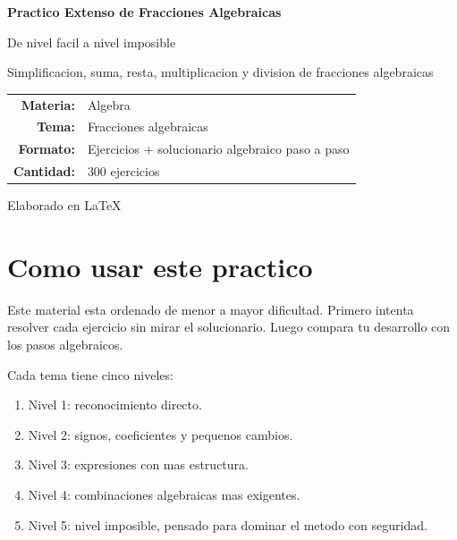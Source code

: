 \documentclass[11pt,a4paper]{article}
\begin{document}
\begin{titlepage}
\centering
{\Huge\bfseries Practico Extenso de Fracciones Algebraicas\par}
\vspace{0.7cm}
{\Large De nivel facil a nivel imposible\par}
\vspace{1cm}
{\large Simplificacion, suma, resta, multiplicacion y division de fracciones algebraicas\par}
\vfill
\begin{tabular}{rl}
\textbf{Materia:} & Algebra \\
\textbf{Tema:} & Fracciones algebraicas \\
\textbf{Formato:} & Ejercicios + solucionario algebraico paso a paso \\
\textbf{Cantidad:} & 300 ejercicios \\
\end{tabular}
\vfill
{\large Elaborado en \LaTeX\par}
\end{titlepage}
\tableofcontents
\newpage
\section*{Como usar este practico}
Este material esta ordenado de menor a mayor dificultad. Primero intenta resolver cada ejercicio sin mirar el solucionario. Luego compara tu desarrollo con los pasos algebraicos.

Cada tema tiene cinco niveles:
\begin{enumerate}
\item Nivel 1: reconocimiento directo.
\item Nivel 2: signos, coeficientes y pequenos cambios.
\item Nivel 3: expresiones con mas estructura.
\item Nivel 4: combinaciones algebraicas mas exigentes.
\item Nivel 5: nivel imposible, pensado para dominar el metodo con seguridad.
\end{enumerate}
\newpage
\end{document}
